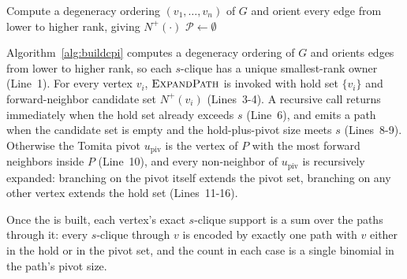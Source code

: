 \begin{algorithm}[t]
\algfontsize
\caption{$\textsc{BuildCPI}(G,\,s)$: standard \cpi{} construction~\cite{NuclearCD}.}
\label{alg:buildcpi}

Compute a degeneracy ordering $(v_1,\ldots,v_n)$ of $G$ and orient every edge from lower to higher rank, giving $N^{+}(\cdot)$\;
$\mathcal{P} \gets \emptyset$\;
\end{algorithm}

Algorithm~\ref{alg:buildcpi} computes a degeneracy ordering of $G$ and orients edges from lower to higher rank, so each $s$-clique has a unique smallest-rank owner (Line~1).
%
For every vertex $v_i$, $\textsc{ExpandPath}$ is invoked with hold set $\{v_i\}$ and forward-neighbor candidate set $N^{+}(v_i)$ (Lines~3-4).
%
A recursive call returns immediately when the hold set already exceeds $s$ (Line~6), and emits a path when the candidate set is empty and the hold-plus-pivot size meets $s$ (Lines~8-9).
%
Otherwise the Tomita pivot $u_{\mathrm{piv}}$ is the vertex of $P$ with the most forward neighbors inside $P$ (Line~10), and every non-neighbor of $u_{\mathrm{piv}}$ is recursively expanded: branching on the pivot itself extends the pivot set, branching on any other vertex extends the hold set (Lines~11-16).

Once the \cpi{} is built, each vertex's exact $s$-clique support is a sum over the paths through it: every $s$-clique through $v$ is encoded by exactly one path with $v$ either in the hold or in the pivot set, and the count in each case is a single binomial in the path's pivot size.

